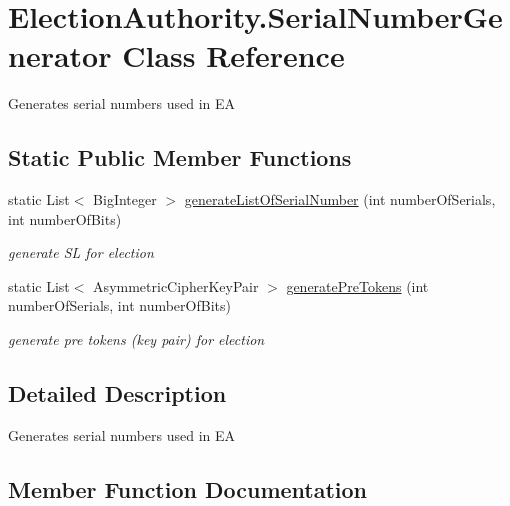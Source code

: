 \hypertarget{class_election_authority_1_1_serial_number_generator}{}\section{Election\+Authority.\+Serial\+Number\+Generator Class Reference}
\label{class_election_authority_1_1_serial_number_generator}


Generates serial numbers used in E\+A  


\subsection*{Static Public Member Functions}
\begin{DoxyCompactItemize}
\item 
static List$<$ Big\+Integer $>$ \hyperlink{class_election_authority_1_1_serial_number_generator_ad035efa786ea1bce9edd67fe6b1ea7e8}{generate\+List\+Of\+Serial\+Number} (int number\+Of\+Serials, int number\+Of\+Bits)
\begin{DoxyCompactList}\small\item\em generate S\+L for election \end{DoxyCompactList}\item 
static List$<$ Asymmetric\+Cipher\+Key\+Pair $>$ \hyperlink{class_election_authority_1_1_serial_number_generator_acd0e3dda33ff955776c88c44c9e84976}{generate\+Pre\+Tokens} (int number\+Of\+Serials, int number\+Of\+Bits)
\begin{DoxyCompactList}\small\item\em generate pre tokens (key pair) for election \end{DoxyCompactList}\end{DoxyCompactItemize}


\subsection{Detailed Description}
Generates serial numbers used in E\+A 



\subsection{Member Function Documentation}
\hypertarget{class_election_authority_1_1_serial_number_generator_ad035efa786ea1bce9edd67fe6b1ea7e8}{}
